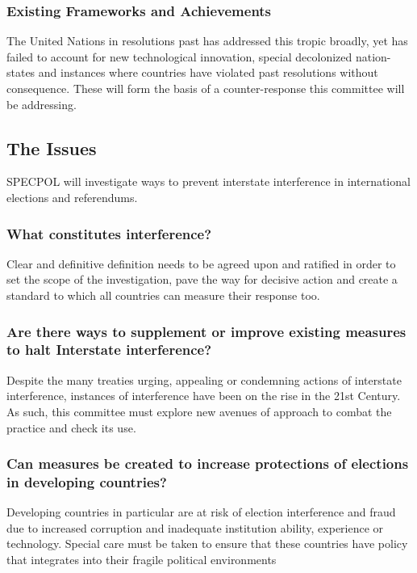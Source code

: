 \documentclass[11pt,a4paper]{report}
\begin{document}
\subsubsection{Existing Frameworks and Achievements}
The United Nations in resolutions past has addressed this tropic broadly, yet has failed to account for new technological innovation, special decolonized nation-states and instances where countries have violated past resolutions without consequence.  These will form the basis of a counter-response this committee will be addressing. 

\subsection{The Issues}

SPECPOL will investigate ways to prevent interstate interference in international elections and referendums.

\subsubsection{What constitutes interference?}

Clear and definitive definition needs to be agreed upon and ratified in order to set the scope of the investigation, pave the way for decisive action and create a standard to which all countries can measure their response too.

\subsubsection{Are there ways to supplement or improve existing measures to halt Interstate interference?}

Despite the many treaties urging, appealing or condemning actions of interstate interference, instances of interference have been on the rise in the 21st Century. As such, this committee must explore new avenues of approach to combat the practice and check its use.

\subsubsection{Can measures be created to increase protections of elections in developing countries?}
Developing countries in particular are at risk of election interference and fraud due to increased corruption and inadequate institution ability, experience or technology. Special care must be taken to ensure that these countries have policy that integrates into their fragile political environments
\end{document}
